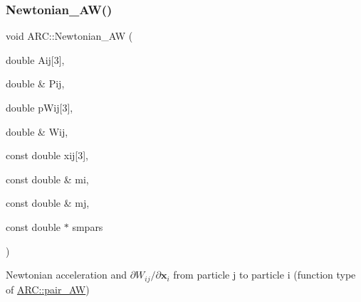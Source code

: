 \subsubsection{\texorpdfstring{Newtonian\+\_\+\+A\+W()}{Newtonian\_AW()}}
{\footnotesize\ttfamily void A\+R\+C\+::\+Newtonian\+\_\+\+AW (\begin{DoxyParamCaption}\item[{double}]{Aij\mbox{[}3\mbox{]},  }\item[{double \&}]{Pij,  }\item[{double}]{p\+Wij\mbox{[}3\mbox{]},  }\item[{double \&}]{Wij,  }\item[{const double}]{xij\mbox{[}3\mbox{]},  }\item[{const double \&}]{mi,  }\item[{const double \&}]{mj,  }\item[{const double $\ast$}]{smpars }\end{DoxyParamCaption})}



Newtonian acceleration and $\partial W_{ij}/\partial \mathbf{x}_i$ from particle j to particle i (function type of \hyperlink{namespaceARC_a5c4308ca4a8d0e0ff59fdce30f00274c}{A\+R\+C\+::pair\+\_\+\+AW}) 


